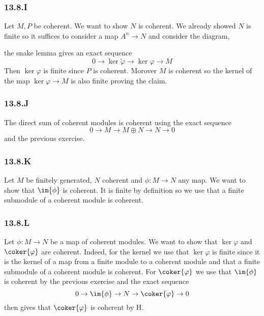 \documentclass[12pt]{article}
\theoremstyle{plain}
\begin{document}
\subsubsection{13.8.I}

Let $M, P$ be coherent. We want to show $N$ is coherent. We already showed $N$ is finite so it suffices to consider a map $A^n \to N$ and consider the diagram,
\begin{center}
\end{center}
the snake lemma gives an exact sequence
\[ 0 \to \ker{\tilde{\varphi}} \to \ker{\varphi} \to M  \]
Then $\ker{\varphi}$ is finite since $P$ is coherent. Morover $M$ is coherent so the kernel of the map $\ker{\varphi} \to M$ is also finite proving the claim.

\subsubsection{13.8.J}

The direct sum of coherent modules is coherent using the exact sequence
\[ 0 \to M \to M \oplus N \to N \to 0 \]
and the previous exercise.

\subsubsection{13.8.K}

Let $M$ be finitely generated, $N$ coherent and $\phi : M \to N$ any map. We want to show that $\im{\phi}$ is coherent. It is finite by definition so we use that a finite submodule of a coherent module is coherent. 

\subsubsection{13.8.L}

Let $\phi : M \to N$ be a map of coherent modules. We want to show that $\ker{\varphi}$ and $\coker{\varphi}$ are coherent. Indeed, for the kernel we use that $\ker{\varphi}$ is finite since it is the kernel of a map from a finite module to a coherent module and that a finite submodule of a coherent module is coherent. For $\coker{\varphi}$ we use that $\im{\phi}$ is coherent by the previous exercise and the exact sequence
\[ 0 \to \im{\phi} \to N \to \coker{\varphi} \to 0 \]
then gives that $\coker{\varphi}$ is coherent by H.
\end{document}
